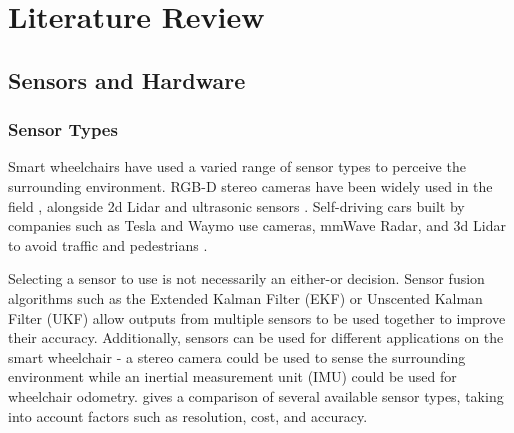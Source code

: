 \documentclass[12pt]{article}
\begin{document}
\pagebreak





\section{Literature Review}


\subsection{Sensors and Hardware}

\subsubsection{Sensor Types}
Smart wheelchairs have used a varied range of sensor types to perceive the surrounding environment.
RGB-D stereo cameras have been widely used in the field \cite{wangS2P2SelfSupervisedGoalDirected2021}\cite{wangSelfSupervisedDrivableArea2019}\cite{jainAutomatedPerceptionSafe2014},
alongside 2d Lidar \cite{scudellariSelfdrivingWheelchairsDebut2017} and ultrasonic sensors \cite{levineNavChairAssistiveWheelchair1999}.
Self-driving cars built by companies such as Tesla and Waymo
use cameras, mmWave Radar, and 3d Lidar to avoid traffic and pedestrians \cite{karpathyTeslaAIDay2021}.

Selecting a sensor to use is not necessarily an either-or decision. Sensor fusion algorithms such as
the Extended Kalman Filter (EKF) or Unscented Kalman Filter (UKF) \cite{wanUnscentedKalmanFilter2000} allow
outputs from multiple sensors to be used together to improve their accuracy. Additionally, sensors can
be used for different applications on the smart wheelchair - a stereo camera could be used to sense the surrounding environment
while an inertial measurement unit (IMU) could be used for wheelchair odometry.
 gives a comparison of several available sensor types,
taking into account factors such as resolution, cost, and accuracy.
\end{document}
